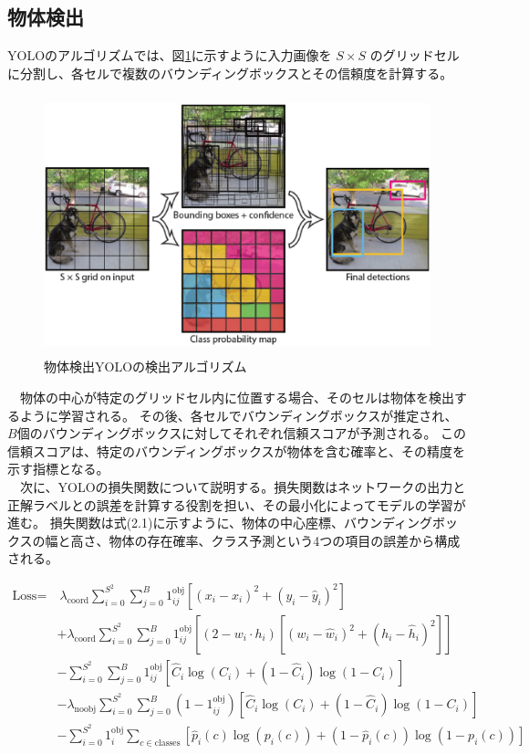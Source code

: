 \subsection{物体検出}
YOLOのアルゴリズムでは、図\ref{fig:f4}に示すように入力画像を $S \times S$ のグリッドセルに分割し、各セルで複数のバウンディングボックスとその信頼度を計算する。\\
\begin{figure}[htbt]
	\centering
	 \includegraphics[height=75mm]{Figure/YOLO.eps}
	 \caption{物体検出YOLOの検出アルゴリズム}
	 \label{fig:f4}
\end{figure}
　物体の中心が特定のグリッドセル内に位置する場合、そのセルは物体を検出するように学習される。
その後、各セルでバウンディングボックスが推定され、$B$個のバウンディングボックスに対してそれぞれ信頼スコアが予測される。
この信頼スコアは、特定のバウンディングボックスが物体を含む確率と、その精度を示す指標となる。\\
　次に、YOLOの損失関数について説明する。損失関数はネットワークの出力と正解ラベルとの誤差を計算する役割を担い、その最小化によってモデルの学習が進む。
損失関数は式(2.1)に示すように、物体の中心座標、バウンディングボックスの幅と高さ、物体の存在確率、クラス予測という4つの項目の誤差から構成される。

\begin{align*}
	\text{Loss} = 
	&\ \lambda_{\text{coord}} \sum_{i=0}^{S^2} \sum_{j=0}^{B} 1^{\text{obj}}_{ij} 
	\left[ (x_i - \hat{x}_i)^2 + (y_i - \hat{y}_i)^2 \right] \\
	&+ \lambda_{\text{coord}} \sum_{i=0}^{S^2} \sum_{j=0}^{B} 1^{\text{obj}}_{ij} 
	\left[ (2 - w_i \cdot h_i) \left[ (w_i - \hat{w}_i)^2 + (h_i - \hat{h}_i)^2 \right] \right] \\
	&- \sum_{i=0}^{S^2} \sum_{j=0}^{B} 1^{\text{obj}}_{ij} 
	\left[ \hat{C}_i \log(C_i) + (1 - \hat{C}_i) \log(1 - C_i) \right] \\
	&- \lambda_{\text{noobj}} \sum_{i=0}^{S^2} \sum_{j=0}^{B} (1 - 1^{\text{obj}}_{ij}) 
	\left[ \hat{C}_i \log(C_i) + (1 - \hat{C}_i) \log(1 - C_i) \right] \\
	&- \sum_{i=0}^{S^2} 1^{\text{obj}}_i \sum_{c \in \text{classes}} 
	\left[ \hat{p}_i(c) \log(p_i(c)) + (1 - \hat{p}_i(c)) \log(1 - p_i(c)) \right]
	\tag{2.1}
\end{align*}

